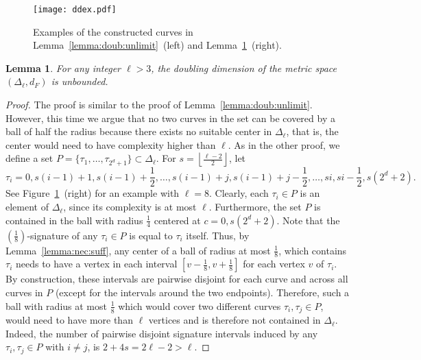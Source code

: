 \documentclass[11pt, letter]{article}
\newtheorem{lemma}[theorem]{Lemma}
\newcommand{\lemref}[1]{Lemma~\ref{lemma:#1}}
\newcommand{\figlab}[1]{\label{fig:#1}}
\newcommand{\figref}[1]{Figure~\ref{fig:#1}}
\providecommand{\floor}[1]{\left\lfloor {#1} \right\rfloor}
\newcommand{\pbrc}[1]{\left[ {#1} \right]}
\begin{document}
\begin{figure}
\centering
\texttt{[image: ddex.pdf]}
\caption{Examples of the constructed curves in \lemref{doub:unlimit}~(left) and \lemref{doub:limit}~(right). }
\figlab{ddex}
\end{figure}



\begin{lemma}
\label{lemma:doub:limit}
For any integer $\ell>3$, the doubling dimension of the metric space $(\Delta_{\ell}, d_F)$ is unbounded.
\end{lemma}
\begin{proof}
The proof is similar to the proof of \lemref{doub:unlimit}. However, this time we argue that no two 
curves in the set can be covered by a ball of half the radius because there exists no suitable 
center in $\Delta_{\ell}$, that is, the center would need to have complexity higher than $\ell$.
As in the other proof, we define a set $P=\lbrace \tau_1,\dots,\tau_{2^d+1}\rbrace \subset \Delta_{\ell}$.
For $s=\floor{\frac{\ell-2}{2}}$, let \[ \tau_i = 0, s(i-1) + 1, s(i-1) +
\frac{1}{2}, \dots, s(i-1) + j, s(i-1) + j - \frac{1}{2}, \dots, s i, s i -
\frac{1}{2}, s(2^d+2).\] 
See \figref{ddex}~(right) for an example with $\ell=8$.
Clearly, each $\tau_i \in P$ is an element of $\Delta_{\ell}$, since its complexity is at most $\ell$.
Furthermore, the set $P$ is contained in the ball with radius $\frac{1}{4}$ centered at $c=0,s(2^{d}+2)$.
Note that the $(\frac{1}{8})$-signature of any $\tau_i\in P$ is equal to $\tau_i$ itself.
Thus, by \lemref{nec:suff}, any center of a ball of radius at most $\frac{1}{8}$, which contains $\tau_i$
 needs to have a vertex in each interval $\pbrc{v-\frac{1}{8},v+\frac{1}{8}}$ for each vertex $v$ of $\tau_i$.
By construction, these intervals are pairwise disjoint for each curve and
across all curves in $P$ (except for the intervals around the two endpoints).
Therefore, such a ball with radius at most $\frac{1}{8}$ which would cover two
different curves $\tau_i,\tau_j \in P$, would need to have more than $\ell$
vertices and is therefore not contained in $\Delta_{\ell}$.
Indeed,  the number of pairwise disjoint signature intervals induced by any $\tau_i,\tau_j \in P$ with $i\neq j$,
is $2+4s = 2 \ell - 2 > \ell$.
\end{proof}





      
\end{document}

